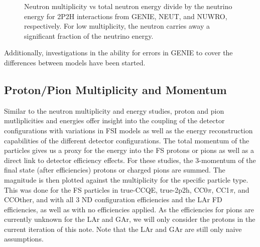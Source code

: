 \documentclass[12pt]{article}
\begin{document}
\begin{figure}
\begin{subfigure}[b]{0.32\textwidth}
\end{subfigure}
\caption{Neutron multiplicity vs total neutron energy divide by the neutrino energy for 2P2H interactions from GENIE, NEUT, and NUWRO, respectively.  For low multiplicity, the neutron carries away a significant fraction of the neutrino energy.} 
\label{fig:Neutron_multi_ene_enu_2p2h_ND}
\end{figure}
\FloatBarrier

 Additionally, investigations in the ability for errors in GENIE to cover the differences between models have been started. 

\subsection{Proton/Pion Multiplicity and Momentum}
\label{subsec:Particle_multiplicities_momentum}

Similar to the neutron multiplicity and energy studies, proton and pion mutliplicities and energies offer insight into the coupling of the detector configurations with variations in FSI models as well as the energy reconstruction capabilities of the different detector configurations. The total momentum of the particles gives us a proxy for the energy into the FS protons or pions as well as a direct link to detector efficiency effects.  For these studies, the 3-momentum of the final state (after efficiencies) protons or charged pions are summed. The magnitude is then plotted against the multiplicity for the specific particle type. This was done for the FS particles in true-CCQE, true-2p2h, CC0$\pi$, CC1$\pi$, and CCOther, and with all 3 ND configuration efficiencies and the LAr FD efficiencies, as well as with no efficiencies applied. As the efficiencies for pions are currently unknown for the LAr and GAr, we will only consider the protons in the current iteration of this note. Note that the LAr and GAr are still only naive assumptions.
\end{document}
